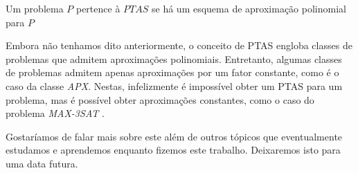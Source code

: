\begin{definition}[PTAS]
Um problema $P$ pertence à $PTAS$ se há um esquema de aproximação polinomial para $P$
\end{definition}

Embora não tenhamos dito anteriormente, o conceito de PTAS engloba classes de problemas que admitem aproximações polinomiais. Entretanto, algumas classes de problemas admitem apenas aproximações por um fator constante, como é o caso da classe \textit{APX}. Nestas, infelizmente é impossível obter um PTAS para um problema, mas é possível obter aproximações constantes, como o caso do problema \textit{MAX-3SAT} \cite{hastad}.

Gostaríamos de falar mais sobre este além de outros tópicos que eventualmente estudamos e aprendemos enquanto fizemos este trabalho. Deixaremos isto para uma data futura.